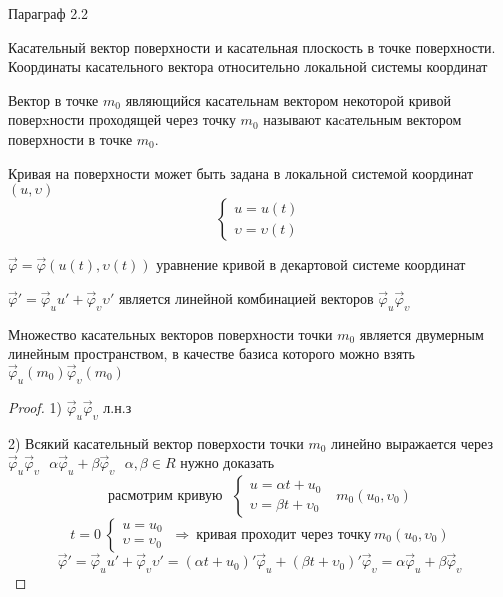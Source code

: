 \begin{title}[\Large]
  Параграф 2.2
\end{title}

\begin{title}[\Large]
  Касательный вектор поверхности и касательная плоскость в точке поверхности.
  Координаты касательного вектора относительно локальной системы координат
\end{title}

\begin{define}
  Вектор в точке $m_0$
  являющийся касательнам вектором некоторой кривой поверxности проходящей
  через точку $m_0$ называют каcательным вектором поверхности в точке $m_0$.

  Кривая на поверхности может быть задана в локальной системой координат
  $(u, \upsilon)$
  $$
  \left\{
    \begin{array}{l}
      u = u(t) \\
      \upsilon = \upsilon(t)
    \end{array}
  \right.
  $$

  $\vec \varphi = \vec \varphi(u(t), \upsilon(t))$ уравнение кривой в декартовой
  системе координат

  $\vec \varphi' = \vec \varphi_u u' + \vec \varphi_{\upsilon}
  \upsilon'$ является линейной комбинацией векторов $\vec \varphi_u
  \vec \varphi_{\upsilon}$
\end{define}

\begin{theorem}
  Множество касательных векторов поверхности точки $m_0$ является двумерным
  линейным пространством, в качестве базиса которого можно взять
  $\vec \varphi_u(m_0) \vec \varphi_{\upsilon}(m_0)$
\end{theorem}

\begin{proof}
  1) $\vec \varphi_u \vec \varphi_{\upsilon}$ л.н.з

  2) Всякий касательный вектор поверхости точки $m_0$ линейно выражается через
  $\vec \varphi_u \vec \varphi_{\upsilon} ~~~ \alpha \vec \varphi_u +\beta
  \vec \varphi_{\upsilon} ~~~ \alpha, \beta \in R$ нужно доказать
  $$
  \text{расмотрим кривую} ~~~
  \left\{
    \begin{array}{l}
      u = \alpha t + u_0 \\
      \upsilon = \beta t + \upsilon_0
    \end{array}
  \right. ~~~ m_0 (u_0, \upsilon_0)
  $$
  $$
  t = 0 ~
  \left\{
    \begin{array}{l}
      u = u_0 \\
      \upsilon = \upsilon_0
    \end{array}
  \right. ~ \Rightarrow ~ \text{кривая проходит через точку} ~
  m_0 (u_0, \upsilon_0)
  $$
  $$
  \vec \varphi' = \vec \varphi_u u' + \vec \varphi_{\upsilon} \upsilon' =
  (\alpha t + u_0)' \vec \varphi_u + (\beta t + \upsilon_0)'
  \vec \varphi_{\upsilon} = \alpha \vec \varphi_u  +
  \beta \vec \varphi_{\upsilon}
  $$
\end{proof}


